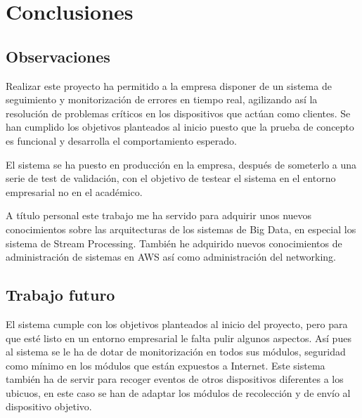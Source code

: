 \chapter{Conclusiones}

\section{Observaciones}

Realizar este proyecto ha permitido a la empresa disponer de un sistema de seguimiento y monitorización de errores en tiempo real, agilizando así la resolución de problemas críticos en los dispositivos que actúan como clientes. Se han cumplido los objetivos planteados al inicio puesto que la prueba de concepto es funcional y desarrolla el comportamiento esperado.

El sistema se ha puesto en producción en la empresa, después de someterlo a una serie de test de validación, con el objetivo de testear el sistema en el entorno empresarial no en el académico.

A título personal este trabajo me ha servido para adquirir unos nuevos conocimientos sobre las arquitecturas de los sistemas de Big Data, en especial los sistema de Stream Processing. También he adquirido nuevos conocimientos de administración de sistemas en AWS así como administración del networking.

\section{Trabajo futuro}

El sistema cumple con los objetivos planteados al inicio del proyecto, pero para que esté listo en un entorno empresarial le falta pulir algunos aspectos.
Así pues al sistema se le ha de dotar de monitorización en todos sus módulos, seguridad como mínimo en los módulos que están expuestos a Internet.
Este sistema también ha de servir para recoger eventos de otros dispositivos diferentes a los ubicuos, en este caso se han de adaptar los módulos de recolección y de envío al dispositivo objetivo.

